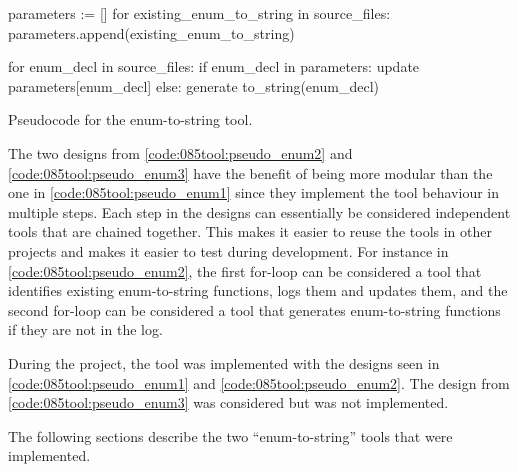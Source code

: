 \begin{listing}[H]
    \begin{pythoncode}
parameters := []
for existing_enum_to_string in source_files:
    parameters.append(existing_enum_to_string)

for enum_decl in source_files:
    if enum_decl in parameters:
        update parameters[enum_decl]
    else:
        generate to_string(enum_decl)
    \end{pythoncode}
    \caption{Pseudocode for the enum-to-string tool.}
    \label{code:085tool:pseudo_enum3}
\end{listing}

The two designs from \cref{code:085tool:pseudo_enum2} and \cref{code:085tool:pseudo_enum3} have the benefit of being more modular than the one in \ref{code:085tool:pseudo_enum1} since they implement the tool behaviour in multiple steps.
Each step in the designs can essentially be considered independent tools that are chained together. This makes it easier to reuse the tools in other projects and makes it easier to test during development. For instance in \cref{code:085tool:pseudo_enum2}, the first for-loop can be considered a tool that identifies existing enum-to-string functions, logs them and updates them, and the second for-loop can be considered a tool that generates enum-to-string functions if they are not in the log.

During the project, the tool was implemented with the designs seen in \cref{code:085tool:pseudo_enum1} and \cref{code:085tool:pseudo_enum2}. The design from \cref{code:085tool:pseudo_enum3} was considered but was not implemented.

The following sections describe the two ``enum-to-string'' tools that were implemented.
